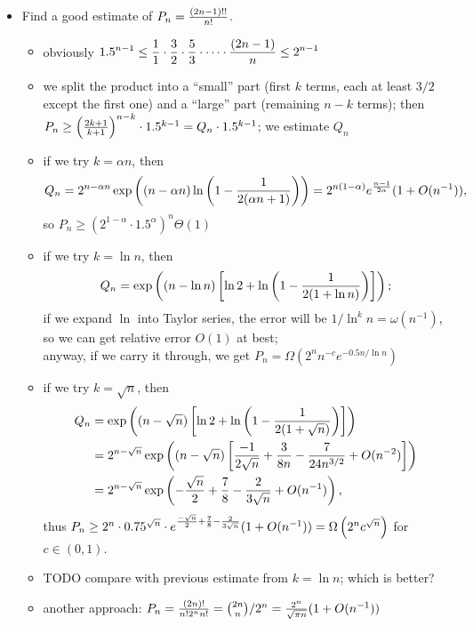 \documentclass[10pt, a4paper]{article}
\begin{document}
\begin{itemize}
\item Find a good estimate of $P_n = {(2n-1)!!\over n!}$.
\begin{itemize}
    \item obviously $\displaystyle 1.5^{n-1}\le {1\over 1}\cdot {3\over 2}\cdot {5\over 3}\cdot \dots \cdot {(2n-1)\over n}\le 2^{n-1}$
    \item we split the product into a ``small'' part (first $k$ terms, each at least $3/2$ except the first one) and a ``large'' part (remaining $n-k$ terms); then\\
        $P_n\ge \left({2k+1\over k+1}\right)^{n-k}\cdot 1.5^{k-1} = Q_n\cdot 1.5^{k-1}$; we estimate $Q_n$
    \item if we try $k = \alpha n$, then
        $$Q_n = 2^{n-\alpha n} \exp \left((n-\alpha n)\ln \left(1-{1\over 2(\alpha n + 1)}\right)\right)=2^{n(1-\alpha)}e^{{\alpha-1\over 2\alpha}}(1+O(n^{-1})),$$
        so $P_n \ge (2^{1-\alpha}\cdot 1.5^\alpha)^n \Theta(1)$
    \item if we try $k = \ln n$, then
        $$Q_n = \exp\left((n-\ln n)\left[\ln 2 + \ln \left(1-{1\over 2(1+\ln n)}\right)\right]\right);$$
        if we expand $\ln$ into Taylor series, the error will be $1/\ln^k n = \omega(n^{-1})$, so we can get relative error $O(1)$ at best;\\
        anyway, if we carry it through, we get $P_n = \Omega(2^n n^{-c} e^{-0.5n/\ln n})$
    \item if we try $k = \sqrt n$, then
        \begin{align*}
        Q_n &= \exp\left((n-\sqrt n)\left[\ln 2 + \ln \left(1-{1\over 2(1+\sqrt n)}\right)\right]\right)\\
            &= 2^{n-\sqrt n}\exp\left((n-\sqrt n)\left[{-1\over 2\sqrt n} + {3\over 8n}-{7\over 24n^{3/2}}+O(n^{-2})\right]\right)\\
            &= 2^{n-\sqrt n}\exp\left(-{\sqrt n\over 2} + {7\over 8}-{2\over 3\sqrt n}+O(n^{-1})\right),
        \end{align*}
        thus $P_n \ge 2^n \cdot 0.75^{\sqrt n}\cdot e^{{-\sqrt n\over 2}+{7\over 8}-{2\over 3\sqrt n}} (1+O(n^{-1})) = \Omega\left(2^n c^{\sqrt n}\right)$ for $c\in (0, 1)$.
    \item TODO compare with previous estimate from $k=\ln n$; which is better?
    \item another approach: $P_n = {(2n)!\over n! 2^n n!} = {2n\choose n}/2^n = {2^n\over \sqrt{\pi n}}(1+O(n^{-1}))$
\end{itemize}

\end{itemize}
\end{document}
